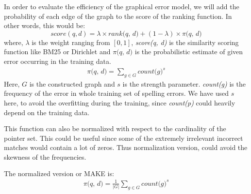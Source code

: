	
	In order to evaluate the efficiency of the graphical error model, we will add the probability of each edge of the graph to the score of the ranking function.
	In other words, this would be:
	\begin{equation*}
	\textit{score}(q, d) =  \lambda \times \textit{rank(q, d)} + (1 - \lambda) \times \pi \textit{(q, d)}
	\end{equation*}
	where, $\lambda$ is the weight ranging from $[0, 1]$, \textit{score(q, d)} is the similarity scoring function like BM25 \cite{bm25} or Dirichlet \cite{dirich}  and $\pi \textit{(q, d)}$ is the probabilistic estimate of given error occurring in the training data.
	\begin{equation*}
	\begin{aligned}
	\pi \textit{(q, d)} =  \sum_{g \in G} \textit{count(g)}^s
	\end{aligned}
	\end{equation*}
	Here, $G$ is the constructed graph and $s$ is the strength parameter.
	\textit{count(g)} is the frequency of the error in whole training set of spelling errors.
	We have used $s$ here, to avoid the overfitting during the training, since \textit{count(p)} could heavily depend on the training data.
	
	This function can also be normalized with respect to the cardinality of the pointer set. 
	This could be useful since some of the extremely irrelevant incorrect matches would contain a lot of zeros.
	Thus normalization version, could avoid the skewness of the frequencies.
	
	The normalized version or MAKE is:
	\begin{equation*}
	\begin{aligned}
	\pi \textit{(q, d)} =  \frac{1}{|G|} \sum_{g \in G} \textit{count(g)}^s
	\end{aligned}
	\end{equation*}